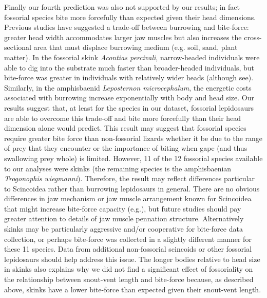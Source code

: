 \documentclass[a4paper, 12pt]{article}
\begin{document}
Finally our fourth prediction was also not supported by our results; in fact fossorial species bite more forcefully than expected given their head dimensions.
Previous studies have suggested a trade-off between burrowing and bite-force: greater head width accommodates larger jaw muscles but also increases the cross-sectional area that must displace burrowing medium (e.g. soil, sand, plant matter). 
In the fossorial skink \textit{Acontias percivali}, narrow-headed individuals were able to dig into the substrate much faster than broader-headed individuals, but bite-force was greater in individuals with relatively wider heads\cite{vanhooydonck2011push} (although see\cite{le2020trade}).
Similarly, in the amphisbaenid \textit{Leposternon microcephalum}, the energetic costs associated with burrowing increase exponentially with body and head size\cite{navas2004morphological}.
Our results suggest that, at least for the species in our dataset, fossorial lepidosaurs are able to overcome this trade-off and bite more forcefully than their head dimension alone would predict. 
This result may suggest that fossorial species require greater bite force than non-fossorial lizards whether it be due to the range of prey that they encounter or the importance of biting when gape (and thus swallowing prey whole) is limited. 
However, 11 of the 12 fossorial species available to our analyses were skinks (the remaining species is the amphisbaenian \textit{Trogonophis wiegmanni}).
Therefore, the result may reflect differences particular to Scincoidea rather than burrowing lepidosaurs in general.
There are no obvious differences in jaw mechanism or jaw muscle arrangement known for Scincoidea that might increase bite-force capacity (e.g.\cite{haas1973muscles,daza2011jaw}), but future studies should pay greater attention to details of jaw muscle pennation structure. 
Alternatively skinks may be particularly aggressive and/or cooperative for bite-force data collection, or perhaps bite-force was collected in a slightly different manner for these 11 species. 
Data from additional non-fossorial scincoids or other fossorial lepidosaurs should help address this issue.
The longer bodies relative to head size in skinks also explains why we did not find a significant effect of fossoriality on the relationship between snout-vent length and bite-force because, as described above, skinks have a lower bite-force than expected given their snout-vent length. 
\end{document}
